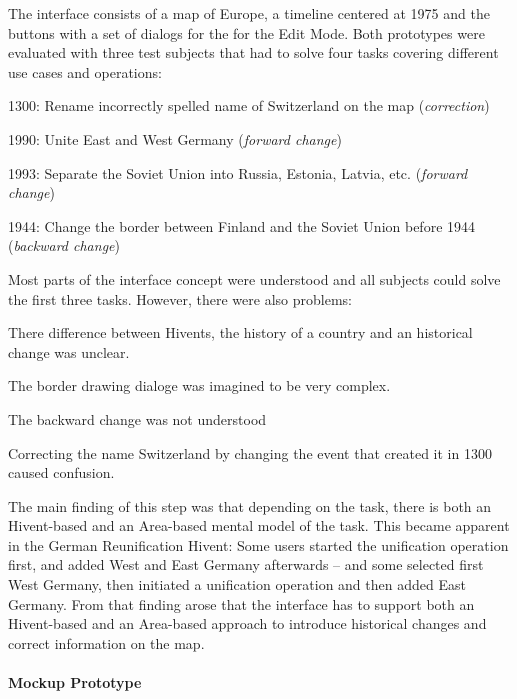 The interface consists of a map of Europe, a timeline centered at 1975 and the buttons with a set of dialogs for the for the Edit Mode. Both prototypes were evaluated with three test subjects that had to solve four tasks covering different use cases and operations:
\begin{compactenum}
  \item 1300: Rename incorrectly spelled name of Switzerland on the map (\emph{correction})
  \item 1990: Unite East and West Germany (\emph{forward change})
  \item 1993: Separate the Soviet Union into Russia, Estonia, Latvia, etc. (\emph{forward change})
  \item 1944: Change the border between Finland and the Soviet Union before 1944 (\emph{backward change})
\end{compactenum}

Most parts of the interface concept were understood and all subjects could solve the first three tasks. However, there were also problems:

\begin{compactenum}
  \item There difference between Hivents, the history of a country and an historical change was unclear.
  \item The border drawing dialoge was imagined to be very complex.
  \item The backward change was not understood
  \item Correcting the name Switzerland by changing the event that created it in 1300 caused confusion.
\end{compactenum}

The main finding of this step was that depending on the task, there is both an Hivent-based and an Area-based mental model of the task. This became apparent in the German Reunification Hivent: Some users started the unification operation first, and added West and East Germany afterwards -- and some selected first West Germany, then initiated a unification operation and then added East Germany. From that finding arose that the interface has to support both an Hivent-based and an Area-based approach to introduce historical changes and correct information on the map.


\paragraph{Mockup Prototype} %
\label{par:mockup_prototype}

